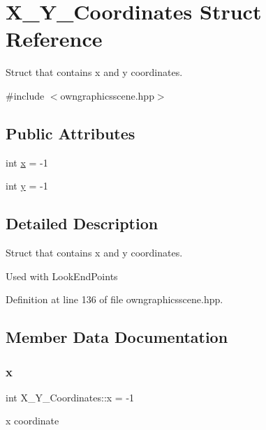 \hypertarget{structX__Y__Coordinates}{}\section{X\+\_\+\+Y\+\_\+\+Coordinates Struct Reference}
\label{structX__Y__Coordinates}


Struct that contains x and y coordinates.  




{\ttfamily \#include $<$owngraphicsscene.\+hpp$>$}

\subsection*{Public Attributes}
\begin{DoxyCompactItemize}
\item 
int \mbox{\hyperlink{structX__Y__Coordinates_a89f7ab800d6777b26a037e82501c6798}{x}} = -\/1
\item 
int \mbox{\hyperlink{structX__Y__Coordinates_a4a608b81d10b65d5b12596ca82df34f6}{y}} = -\/1
\end{DoxyCompactItemize}


\subsection{Detailed Description}
Struct that contains x and y coordinates. 

Used with Look\+End\+Points 

Definition at line 136 of file owngraphicsscene.\+hpp.



\subsection{Member Data Documentation}
\mbox{\label{structX__Y__Coordinates_a89f7ab800d6777b26a037e82501c6798}} 
\subsubsection{\texorpdfstring{x}{x}}
{\footnotesize\ttfamily int X\+\_\+\+Y\+\_\+\+Coordinates\+::x = -\/1}

x coordinate 

